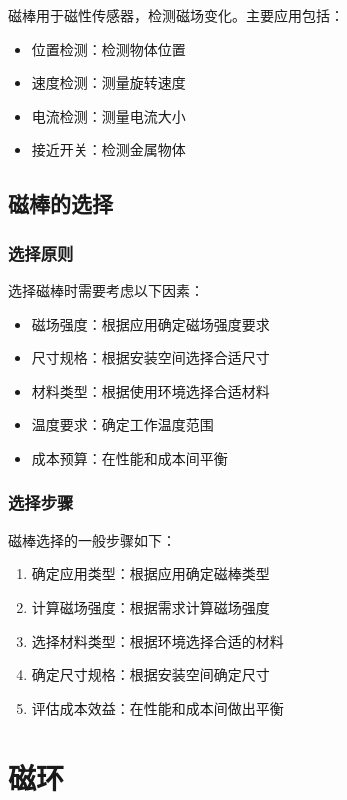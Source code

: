\documentclass[12pt,UTF8]{ctexbook}
\begin{document}
磁棒用于磁性传感器，检测磁场变化。主要应用包括：

\begin{itemize}[leftmargin=2cm]
    \item 位置检测：检测物体位置
    \item 速度检测：测量旋转速度
    \item 电流检测：测量电流大小
    \item 接近开关：检测金属物体
\end{itemize}

\section{磁棒的选择}

\subsection{选择原则}

选择磁棒时需要考虑以下因素：

\begin{itemize}[leftmargin=2cm]
    \item 磁场强度：根据应用确定磁场强度要求
    \item 尺寸规格：根据安装空间选择合适尺寸
    \item 材料类型：根据使用环境选择合适材料
    \item 温度要求：确定工作温度范围
    \item 成本预算：在性能和成本间平衡
\end{itemize}

\subsection{选择步骤}

磁棒选择的一般步骤如下：

\begin{enumerate}[leftmargin=2cm]
    \item 确定应用类型：根据应用确定磁棒类型
    \item 计算磁场强度：根据需求计算磁场强度
    \item 选择材料类型：根据环境选择合适的材料
    \item 确定尺寸规格：根据安装空间确定尺寸
    \item 评估成本效益：在性能和成本间做出平衡
\end{enumerate}

\chapter{磁环}
\end{document}
